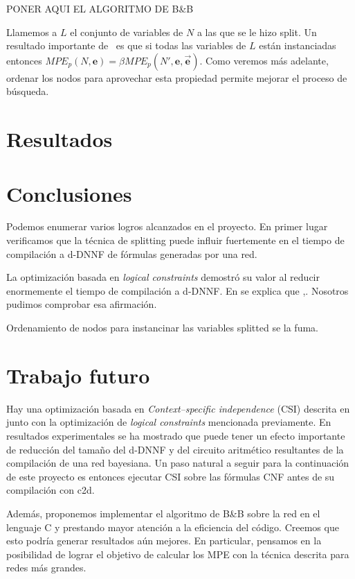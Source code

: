 \documentclass[11pt, letterpaper]{article}
\begin{document}
PONER AQUI EL ALGORITMO DE B\&B

Llamemos a $L$ el conjunto de variables de $N$ a las que se le hizo
split. Un resultado importante de~\cite{ChoiChaviraDarwiche07} es que
si todas las variables de $L$ están instanciadas entonces $MPE_p(N,
\mathbf{e}) = \beta MPE_p(N', \mathbf{e}, \vec{\mathbf{e}})$. Como veremos
más adelante, ordenar los nodos para aprovechar esta propiedad permite
mejorar el proceso de búsqueda.

\section{Resultados}

\section{Conclusiones}

Podemos enumerar varios logros alcanzados en el proyecto. En primer lugar
verificamos que la técnica de splitting puede influir fuertemente en el tiempo
de compilación a d-DNNF de fórmulas generadas por una red.

La optimización basada en \emph{logical constraints} demostró su valor al
reducir enormemente el tiempo de compilación a d-DNNF. En
\cite{Darwiche01alogical} se explica que ,. Nosotros pudimos comprobar esa
afirmación.

Ordenamiento de nodos para instancinar las variables splitted se la fuma.

\section{Trabajo futuro}

Hay una optimización basada en \emph{Context–specific independence} (CSI)
descrita en
\cite{Darwiche01alogical} junto con la optimización de \emph{logical constraints}
mencionada previamente. En resultados experimentales se ha mostrado que puede
tener un efecto importante de reducción del tamaño del d-DNNF y del circuito
aritmético resultantes de la compilación de una red bayesiana. Un paso natural a
seguir para la continuación de este proyecto es entonces ejecutar CSI sobre las
fórmulas CNF antes de su compilación con c2d.

Además, proponemos implementar el algoritmo de B\&B sobre la red en el
lenguaje C y prestando mayor atención a la eficiencia del código. Creemos
que esto podría generar resultados aún mejores. En particular, pensamos en la
posibilidad de lograr el objetivo de calcular los MPE con la técnica descrita
para redes más grandes.



\end{document}
